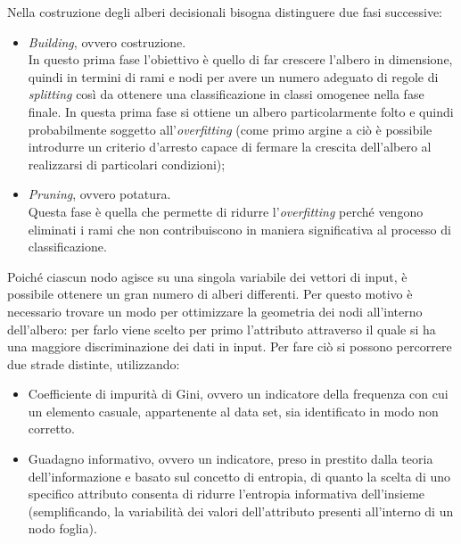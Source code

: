 Nella costruzione degli alberi decisionali bisogna distinguere due fasi successive:
\begin{itemize}
	\item \textit{Building}, ovvero costruzione.\\
	In questo prima fase l'obiettivo è quello di far crescere l'albero in dimensione, quindi in termini di rami e nodi per avere un numero adeguato di regole di \textit{splitting} così da ottenere una classificazione in classi omogenee nella fase finale. In questa prima fase si ottiene un albero particolarmente folto e quindi probabilmente soggetto all'\textit{overfitting} (come primo argine a ciò è possibile introdurre un criterio d'arresto capace di fermare la crescita dell'albero al realizzarsi di particolari condizioni);
	\item \textit{Pruning}, ovvero potatura.\\
	Questa fase è quella che permette di ridurre l'\textit{overfitting} perché vengono eliminati i rami che non contribuiscono in maniera significativa al processo di classificazione.
	
\end{itemize} 

Poiché ciascun nodo agisce su una singola variabile dei vettori di input, è possibile ottenere un gran numero di alberi differenti. Per questo motivo è necessario trovare un modo per ottimizzare la geometria dei nodi all'interno dell'albero: per farlo viene scelto per primo l'attributo attraverso il quale si ha una maggiore discriminazione dei dati in input. Per fare ciò si possono percorrere due strade distinte, utilizzando:
\begin{itemize}
	\item Coefficiente di impurità di Gini, ovvero un indicatore della frequenza con cui un elemento casuale, appartenente al data set, sia identificato in modo non corretto.
	\item Guadagno informativo, ovvero un indicatore, preso in prestito dalla teoria dell'informazione e basato sul concetto di entropia, di quanto la scelta di uno specifico attributo consenta di ridurre l’entropia informativa dell'insieme (semplificando, la variabilità dei valori dell'attributo presenti all'interno di un nodo foglia). 
\end{itemize}  

